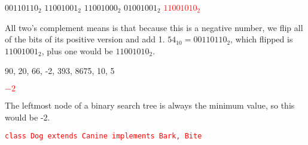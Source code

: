 \documentclass[11pt,addpoints]{exam}
\begin{document}
\begin{questions}
\begin{minipage}{\textwidth}
\begin{choices}
  \choice $00110110_{2}$
  \choice $11001001_{2}$
  \choice $11001000_{2}$
  \choice $01001001_{2}$
  \choice \textcolor{red}{$11001010_{2}$} \\
\end{choices}

  All two's complement means is that because this is a negative number, we flip all of the bits of its positive version and add 1. $54_{10} = 00110110_{2}$, which flipped is $11001001_{2}$, plus one would be $11001010_{2}$. \\

\end{minipage}

\begin{minipage}{\textwidth}

90, 20, 66, -2, 393, 8675, 10, 5 \\

\begin{choices}
  \choice \textcolor{red}{$-2$}
   \\
\end{choices}

The leftmost node of a binary search tree is always the minimum value, so this would be -2. \\

\end{minipage}


\begin{minipage}{\textwidth}

\begin{choices}
  \choice \textcolor{red}{\tt class Dog extends Canine implements Bark, Bite}
   \\
\end{choices}

\end{minipage}


\end{questions}
\end{document}
